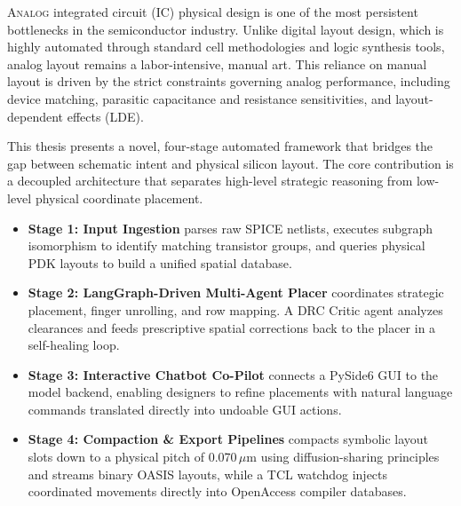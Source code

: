 \vspace{0.3cm}
\grandornament
\vspace{0.6cm}

\noindent
\lettrine[lines=3, findent=3pt, nindent=0pt]{A}{nalog} integrated circuit (IC) physical design is one of the most persistent bottlenecks in the semiconductor industry. Unlike digital layout design, which is highly automated through standard cell methodologies and logic synthesis tools, analog layout remains a labor-intensive, manual art. This reliance on manual layout is driven by the strict constraints governing analog performance, including device matching, parasitic capacitance and resistance sensitivities, and layout-dependent effects (LDE).

\vspace{0.4cm}

\noindent
This thesis presents a novel, four-stage automated framework that bridges the gap between schematic intent and physical silicon layout. The core contribution is a decoupled architecture that separates high-level strategic reasoning from low-level physical coordinate placement.

\vspace{0.4cm}

\begin{itemize}
  \item \textbf{\color{AcademicBlue}Stage 1: Input Ingestion} parses raw SPICE netlists, executes subgraph isomorphism to identify matching transistor groups, and queries physical PDK layouts to build a unified spatial database.
  \item \textbf{\color{AcademicBlue}Stage 2: LangGraph-Driven Multi-Agent Placer} coordinates strategic placement, finger unrolling, and row mapping. A DRC Critic agent analyzes clearances and feeds prescriptive spatial corrections back to the placer in a self-healing loop.
  \item \textbf{\color{AcademicBlue}Stage 3: Interactive Chatbot Co-Pilot} connects a PySide6 GUI to the model backend, enabling designers to refine placements with natural language commands translated directly into undoable GUI actions.
  \item \textbf{\color{AcademicBlue}Stage 4: Compaction \& Export Pipelines} compacts symbolic layout slots down to a physical pitch of 0.070\,\(\mu\)m using diffusion-sharing principles and streams binary OASIS layouts, while a TCL watchdog injects coordinated movements directly into OpenAccess compiler databases.
\end{itemize}


\vspace{0.5cm}
\grandornament

